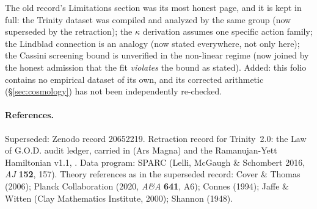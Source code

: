 \documentclass{alienfolio}
\begin{document}
The old record's Limitations section was its most honest page, and it
is kept in full: the Trinity dataset was compiled and analyzed by the
same group (now superseded by the retraction); the $\kappa$
derivation assumes one specific action family; the Lindblad
connection is an analogy (now stated everywhere, not only here); the
Cassini screening bound is unverified in the non-linear regime (now
joined by the honest admission that the fit \emph{violates} the bound
as stated). Added: this folio contains no empirical dataset of its
own, and its corrected arithmetic (\S\ref{sec:cosmology}) has not
been independently re-checked.

\goldrule

\paragraph{References.} Superseded: Zenodo record 20652219. Retraction
record for Trinity~2.0: the Law of G.O.D. audit ledger, carried in
 (Ars Magna) and the Ramanujan-Yett
Hamiltonian v1.1, . Data program: SPARC
(Lelli, McGaugh \& Schombert 2016, \textit{AJ} \textbf{152}, 157).
Theory references as in the superseded record: Cover \& Thomas
(2006); Planck Collaboration (2020, \textit{A\&A} \textbf{641}, A6);
Connes (1994); Jaffe \& Witten (Clay Mathematics Institute, 2000);
Shannon (1948).
\end{document}
